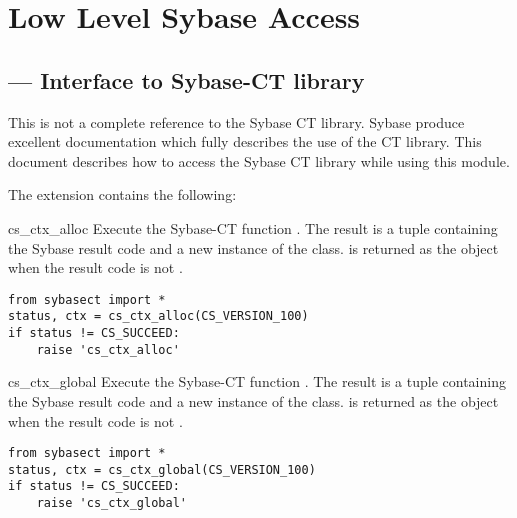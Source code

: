 \chapter{Low Level Sybase Access}

\localmoduletable

\section{ --- Interface to Sybase-CT library}



This is not a complete reference to the Sybase CT library.  Sybase
produce excellent documentation which fully describes the use of the
CT library.  This document describes how to access the Sybase CT
library while using this module.

The  extension contains the following:

\begin{funcdesc}{cs_ctx_alloc}{}
Execute the Sybase-CT function .  The result
is a tuple containing the Sybase result code and a new instance of the
 class.   is returned as the
 object when the result code is not
.

\begin{verbatim}
from sybasect import *
status, ctx = cs_ctx_alloc(CS_VERSION_100)
if status != CS_SUCCEED:
    raise 'cs_ctx_alloc'
\end{verbatim}
\end{funcdesc}

\begin{funcdesc}{cs_ctx_global}{}
Execute the Sybase-CT function .  The result
is a tuple containing the Sybase result code and a new instance of the
 class.   is returned as the
 object when the result code is not
.

\begin{verbatim}
from sybasect import *
status, ctx = cs_ctx_global(CS_VERSION_100)
if status != CS_SUCCEED:
    raise 'cs_ctx_global'
\end{verbatim}
\end{funcdesc}

